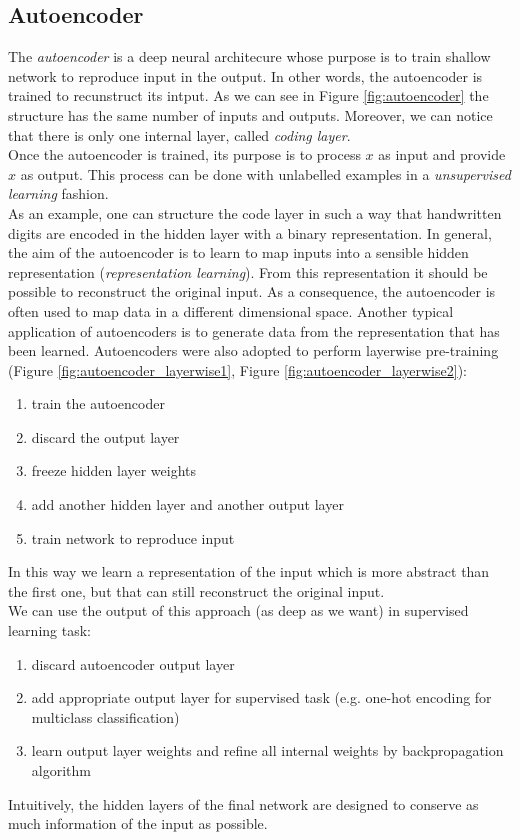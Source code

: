 \subsection{Autoencoder}
The \textit{autoencoder} is a deep neural architecure whose purpose is to train shallow network to reproduce input in the output. In other words, the autoencoder is trained to recunstruct its intput. As we can see in Figure \ref{fig:autoencoder} the structure has the same number of inputs and outputs. Moreover, we can notice that there is only one internal layer, called \textit{coding layer}. \\ Once the autoencoder is trained, its purpose is to process $x$ as input and provide $x$ as output. This process can be done with unlabelled examples in a \textit{unsupervised learning} fashion.\\
As an example, one can structure the code layer in such a way that handwritten digits are encoded in the hidden layer with a binary representation. In general, the aim of the autoencoder is to learn to map inputs into a sensible hidden representation (\textit{representation learning}). From this representation it should be possible to reconstruct the original input. As a consequence, the autoencoder is often used to map data in a different dimensional space. Another typical application of autoencoders is to generate data from the representation that has been learned. Autoencoders were also adopted to perform layerwise pre-training (Figure \ref{fig:autoencoder_layerwise1}, Figure \ref{fig:autoencoder_layerwise2}):
\begin{enumerate}
    \item train the autoencoder
    \item discard the output layer
    
    \item freeze hidden layer weights
    
    \item add another hidden layer and another output layer
    
    \item train network to reproduce input
\end{enumerate}
In this way we learn a representation of the input which is more abstract than the first one, but that can still reconstruct the original input. \\ We can use the output of this approach (as deep as we want) in supervised learning task:
\begin{enumerate}
    \item discard autoencoder output layer
    \item add appropriate output layer for supervised task (e.g. one-hot encoding for multiclass classification)
    \item learn output layer weights and refine all internal weights by backpropagation algorithm
\end{enumerate}
Intuitively, the hidden layers of the final network are designed to conserve as much information of the input as possible. \newline

